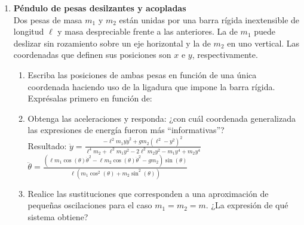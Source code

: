 \documentclass[11pt, spanish, a4paper, twoside]{article}
\begin{document}
\begin{enumerate}
	\item 
	\begin{minipage}[t][2.5cm]{0.75\textwidth}
		\textbf{Péndulo de pesas desilzantes y acopladas}\\ 
		Dos pesas de masa \(m_1\) y \(m_2\) están unidas por una barra rígida inextensible de longitud \(\ell\) y masa despreciable frente a las anteriores.
		La de \(m_1\) puede deslizar sin rozamiento sobre un eje horizontal y la de \(m_2\) en uno vertical.
		Las coordenadas que definen sus posiciones son \(x\) e \(y\), respectivamente.
	\end{minipage}
	\begin{minipage}[c][1.5cm][t]{0.25\textwidth}
		
	\end{minipage}
	\begin{enumerate}
		\item Escriba las posiciones de ambas pesas en función de una única coordenada haciendo uso de la ligadura que impone la barra rígida.
		Exprésalas primero en función de:
		\item Obtenga las aceleraciones y responda: ¿con cuál coordenada generalizada las expresiones de energía fueron más ``informativas''?\\
		Resultado:
			$\ddot{y} = \frac{- \ell^{2} m_{1} y \dot{y}^{2} + g m_{2} \left(\ell^{2} - y^{2}\right)^{2}}{\ell^{4} m_{2} + \ell^{2} m_{1} y^{2} - 2 \ell^{2} m_{2} y^{2} - m_{1} y^{4} + m_{2} y^{4}}$
			\qquad
			$\ddot{\theta} = \frac{\left(\ell m_{1} \cos{\left(\theta \right)} \dot{\theta}^{2} - \ell m_{2} \cos{\left(\theta \right)} \dot{\theta}^{2} - g m_{2}\right) \sin{\left(\theta \right)}}{\ell \left(m_{1} \cos^{2}{\left(\theta \right)} + m_{2} \sin^{2}{\left(\theta \right)}\right)}$
		\item Realice las sustituciones que corresponden a una aproximación de pequeñas oscilaciones para el caso \(m_1 = m_2 = m\). ¿La expresión de qué sistema obtiene?
	\end{enumerate}



\end{enumerate}
\end{document}
